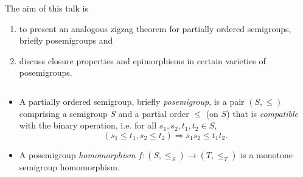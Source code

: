 \documentclass[notes=show]{beamer}
\newenvironment{stepenumerate}{\begin{enumerate}[<+->]}{\end{enumerate}}
\newenvironment{stepitemize}{\begin{itemize}[<+->]}{\end{itemize} }
\begin{document}
\begin{frame}%


The aim of this talk is\bigskip

\begin{stepenumerate}
\item to present an analogous zigzag theorem for partially ordered
semigroups, briefly posemigroups and\bigskip

\item discuss closure properties and epimorphisms in certain varieties of
posemigroups.
\end{stepenumerate}

\begin{equation*}
\end{equation*}

\transboxout%
\end{frame}%

\begin{frame}%


\begin{stepitemize}
\item A partially ordered semigroup, briefly \textit{posemigroup}, is a pair 
$(S,\leq )$ comprising a semigroup $S$ and a partial order $\leq $ (on $S$)
that is \textit{compatible} with the binary operation, i.e. for all $%
s_{1},s_{2},t_{1},t_{2}\in S$,%
\begin{equation*}
(s_{1}\leq t_{1},s_{2}\leq t_{2})\Longrightarrow s_{1}s_{2}\leq t_{1}t_{2}.
\end{equation*}%
\smallskip

\item A posemigroup \textit{homomorphism} $f:(S,\leq _{S})\longrightarrow
(T,\leq _{T})$ is a monotone semigroup homomorphism.
\end{stepitemize}

\transboxout%
\end{frame}%
\end{document}
